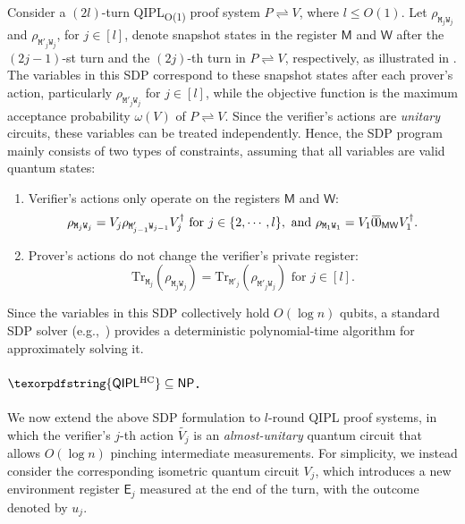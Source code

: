 \documentclass[10pt,a4paper]{article}
\numberwithin{equation}{section}
\numberwithin{figure}{section}
\newcommand{\NP}{\textnormal{\textsf{NP}}\xspace}
\newcommand{\QIPL}{\textnormal{\textsf{QIPL}}\xspace}
\newcommand{\QIPLconst}{\texorpdfstring{\textnormal{\textsf{QIPL}\textsubscript{O(1)}}}\xspace}
\newcommand{\QIPLHC}{\texorpdfstring{\textnormal{\textsf{QIPL}\textsuperscript{\textnormal{HC}}}}\xspace}
\newcommand{\protocol}[2]{{#1}\!\rightleftharpoons\!{#2}}
\let\ket\relax\DeclarePairedDelimiter\ket{\lvert}{\rangle}
\let\bra\relax\DeclarePairedDelimiter\bra{\langle}{\rvert}
\newcommand{\ketbra}[2]{\ensuremath{\ket{#1}\!\bra{#2}}}
\newcommand{\Tr}{\mathrm{Tr}}
\newcommand{\sfE}{\mathsf{E}}
\newcommand{\sfM}{\mathsf{M}}
\newcommand{\sfW}{\mathsf{W}}
\newcommand{\ttM}{\mathtt{M}}
\newcommand{\ttW}{\mathtt{W}}
\begin{document}
Consider a $(2l)$-turn \QIPLconst{} proof system $\protocol{P}{V}$, where $l \leq O(1)$.
Let $\rho_{\ttM_j\ttW_j}$ and $\rho_{\ttM'_j\ttW_j}$, for $j \in [l]$, denote snapshot states in the register $\sfM$ and $\sfW$ after the $(2j-1)$-st turn and the $(2j)$-th turn in $\protocol{P}{V}$, respectively, as illustrated in . The variables in this SDP correspond to these snapshot states after each prover's action, particularly $\rho_{\ttM'_j\ttW_j}$ for $j\in[l]$, while the objective function is the maximum acceptance probability $\omega(V)$ of $\protocol{P}{V}$. 
Since the verifier's actions are \textit{unitary} circuits, these variables can be treated independently. Hence, the SDP program mainly consists of two types of constraints, assuming that all variables are valid quantum states: 
\begin{enumerate}[label={\upshape(\roman*)}, itemsep=0.33em, topsep=0.33em, parsep=0.33em]
    \item Verifier's actions only operate on the registers $\sfM$ and $\sfW$: 
    \[\rho_{\ttM_{j}\ttW_{j}} = V_{j} \rho_{\ttM'_{j-1}\ttW_{j-1}} V_{j}^{\dagger} \text{ for } j\in \{2,\cdots,l\}, \text{ and } \rho_{\ttM_1\ttW_1} = V_1 \ketbra{\bar{0}}{\bar{0}}_{\sfM\sfW}V_1^{\dagger}.\] 
    \item Prover's actions do not change the verifier's private register: 
    \begin{equation}
        \label{eq:QSZKL-constraint}
        \Tr_{\ttM_j}(\rho_{\ttM_j\ttW_j}) = \Tr_{\ttM'_j}(\rho_{\ttM'_j\ttW_j}) \text{ for } j \in [l].
    \end{equation} 
\end{enumerate}
Since the variables in this SDP collectively hold $O(\log{n})$ qubits, a standard SDP solver (e.g.,~\cite{GM12}) provides a deterministic polynomial-time algorithm for approximately solving it. 

\paragraph{$\QIPLHC \subseteq \NP$.} 
We now extend the above SDP formulation to $l$-round \QIPL{} proof systems, in which the verifier's $j$-th action $\widetilde{V_j}$ is an \textit{almost-unitary} quantum circuit that allows $O(\log{n})$ pinching intermediate measurements. For simplicity, we instead consider the corresponding isometric quantum circuit $V_j$, which introduces a new environment register $\sfE_j$ measured at the end of the turn, with the outcome denoted by $u_j$. 
\end{document}
